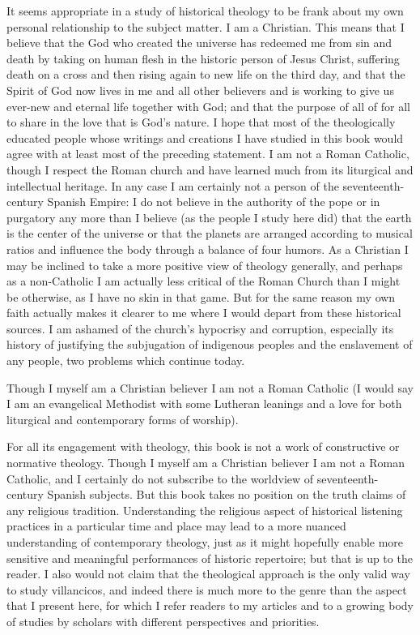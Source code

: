 It seems appropriate in a study of historical theology to be frank about my own
personal relationship to the subject matter.
I am a Christian.
This means that I believe that the God who created the universe has redeemed me
from sin and death by taking on human flesh in the historic person of Jesus
Christ, suffering death on a cross and then rising again to new life on the
third day, and that the Spirit of God now lives in me and all other believers
and is working to give us ever-new and eternal life together with God; and that
the purpose of all of for all to share in the love that is God's nature.
I hope that most of the theologically educated people whose writings and
creations I have studied in this book would agree with at least most of the
preceding statement.
I am not a Roman Catholic, though I respect the Roman church and have learned
much from its liturgical and intellectual heritage.
In any case I am certainly not a person of the seventeenth-century Spanish
Empire: I do not believe in the authority of the pope or in purgatory any more
than I believe (as the people I study here did) that the earth is the center of
the universe or that the planets are arranged according to musical ratios and
influence the body through a balance of four humors.
As a Christian I may be inclined to take a more positive view of theology
generally, and perhaps as a non-Catholic I am actually less critical of the
Roman Church than I might be otherwise, as I have no skin in that game.
But for the same reason my own faith actually makes it clearer to me where I
would depart from these historical sources.
I am ashamed of the church's hypocrisy and corruption, especially its history
of justifying the subjugation of indigenous peoples and the enslavement of any
people, two problems which continue today.

Though I myself am a Christian believer I am not a Roman Catholic (I would say
I am an evangelical Methodist with some Lutheran leanings and a love for both
liturgical and contemporary forms of worship).

For all its engagement with theology, this book is not a work of constructive
or normative theology. 
Though I myself am a Christian believer I am not a Roman Catholic, and I
certainly do not subscribe to the worldview of seventeenth-century Spanish
subjects.
But this book takes no position on the truth claims of any religious tradition.
Understanding the religious aspect of historical listening practices in a
particular time and place may lead to a more nuanced understanding of
contemporary theology, just as it might hopefully enable more sensitive and
meaningful performances of historic repertoire; but that is up to the reader.
I also would not claim that the theological approach is the only valid way to
study villancicos, and indeed there is much more to the genre than the aspect
that I present here, for which I refer readers to my articles and to a growing
body of studies by scholars with different perspectives and priorities.

